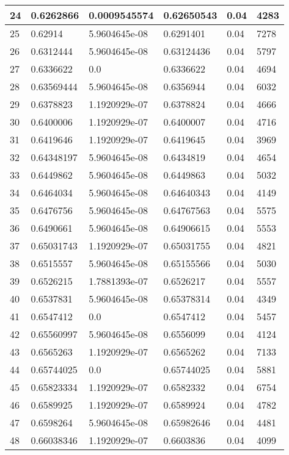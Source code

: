 \begin{longtable}{|l|l|l|l|l|l|}
24 & 0.6262866 & 0.0009545574 & 0.62650543 & 0.04 & 4283 \\ \hline 
25 & 0.62914 & 5.9604645e-08 & 0.6291401 & 0.04 & 7278 \\ \hline 
26 & 0.6312444 & 5.9604645e-08 & 0.63124436 & 0.04 & 5797 \\ \hline 
27 & 0.6336622 & 0.0 & 0.6336622 & 0.04 & 4694 \\ \hline 
28 & 0.63569444 & 5.9604645e-08 & 0.6356944 & 0.04 & 6032 \\ \hline 
29 & 0.6378823 & 1.1920929e-07 & 0.6378824 & 0.04 & 4666 \\ \hline 
30 & 0.6400006 & 1.1920929e-07 & 0.6400007 & 0.04 & 4716 \\ \hline 
31 & 0.6419646 & 1.1920929e-07 & 0.6419645 & 0.04 & 3969 \\ \hline 
32 & 0.64348197 & 5.9604645e-08 & 0.6434819 & 0.04 & 4654 \\ \hline 
33 & 0.6449862 & 5.9604645e-08 & 0.6449863 & 0.04 & 5032 \\ \hline 
34 & 0.6464034 & 5.9604645e-08 & 0.64640343 & 0.04 & 4149 \\ \hline 
35 & 0.6476756 & 5.9604645e-08 & 0.64767563 & 0.04 & 5575 \\ \hline 
36 & 0.6490661 & 5.9604645e-08 & 0.64906615 & 0.04 & 5553 \\ \hline 
37 & 0.65031743 & 1.1920929e-07 & 0.65031755 & 0.04 & 4821 \\ \hline 
38 & 0.6515557 & 5.9604645e-08 & 0.65155566 & 0.04 & 5030 \\ \hline 
39 & 0.6526215 & 1.7881393e-07 & 0.6526217 & 0.04 & 5557 \\ \hline 
40 & 0.6537831 & 5.9604645e-08 & 0.65378314 & 0.04 & 4349 \\ \hline 
41 & 0.6547412 & 0.0 & 0.6547412 & 0.04 & 5457 \\ \hline 
42 & 0.65560997 & 5.9604645e-08 & 0.6556099 & 0.04 & 4124 \\ \hline 
43 & 0.6565263 & 1.1920929e-07 & 0.6565262 & 0.04 & 7133 \\ \hline 
44 & 0.65744025 & 0.0 & 0.65744025 & 0.04 & 5881 \\ \hline 
45 & 0.65823334 & 1.1920929e-07 & 0.6582332 & 0.04 & 6754 \\ \hline 
46 & 0.6589925 & 1.1920929e-07 & 0.6589924 & 0.04 & 4782 \\ \hline 
47 & 0.6598264 & 5.9604645e-08 & 0.65982646 & 0.04 & 4481 \\ \hline 
48 & 0.66038346 & 1.1920929e-07 & 0.6603836 & 0.04 & 4099 \\ \hline 

\end{longtable}

